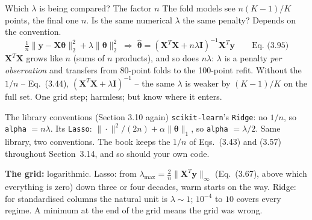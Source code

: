 \documentclass[10pt,aspectratio=169]{beamer}
\begin{document}
\begin{frame}{Which $\lambda$ is being compared?  The factor $n$}
The fold models see $n(K-1)/K$ points, the final one $n$.  Is the same
numerical $\lambda$ the same penalty?  Depends on the convention.
\[
  \tfrac{1}{n}\|\bm{y}-\bm{X}\bm{\theta}\|_2^2+\lambda\|\bm{\theta}\|_2^2
  \;\Rightarrow\;
  \hat{\bm{\theta}}=(\bm{X}^T\bm{X}+n\lambda\bm{I})^{-1}\bm{X}^T\bm{y}
  \qquad\text{Eq.~(3.95)}
\]
$\bm{X}^T\bm{X}$ grows like $n$ (sums of $n$ products), and so does
$n\lambda$: $\lambda$ is a penalty \emph{per observation} and transfers from
80-point folds to the 100-point refit.  Without the $1/n$ -- Eq.~(3.44),
$(\bm{X}^T\bm{X}+\lambda\bm{I})^{-1}$ -- the same $\lambda$ is weaker by
$(K-1)/K$ on the full set.  One grid step; harmless; but know where it enters.
\vspace{3pt}
\begin{block}{The library conventions (Section 3.10 again)}
\texttt{scikit-learn}'s \texttt{Ridge}: no $1/n$, so \texttt{alpha} $=n\lambda$.
Its \texttt{Lasso}: $\|\cdot\|^2/(2n)+\alpha\|\bm{\theta}\|_1$, so
\texttt{alpha} $=\lambda/2$.  Same library, two conventions.  The
book keeps the $1/n$ of Eqs.~(3.43) and (3.57) throughout Section~3.14, and
so should your own code.
\end{block}
\vspace{2pt}
\small
\textbf{The grid:} logarithmic.  Lasso: from $\lambda_{\max}=\tfrac{2}{n}\|\bm{X}^T\bm{y}\|_\infty$
(Eq.~(3.67), above which everything is zero) down three or four decades, warm
starts on the way.  Ridge: for standardised columns the natural unit is
$\lambda\sim1$; $10^{-4}$ to $10$ covers every regime.  A minimum at the end
of the grid means the grid was wrong.
\end{frame}
\end{document}
